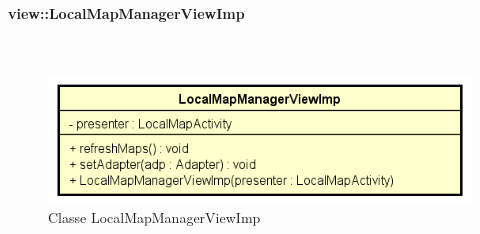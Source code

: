 \documentclass[../DefinizioneDiProdotto.tex]{subfiles}
\begin{document}
\paragraph{view::LocalMapManagerViewImp}
\
\begin{figure}[H]
	\centering
	\includegraphics[width=\maxwidth]{img/LocalMapManagerViewImp.png}
	\caption{Classe LocalMapManagerViewImp}\label{fig:view::LocalMapManagerViewImp} 
\end{figure}
\end{document}
